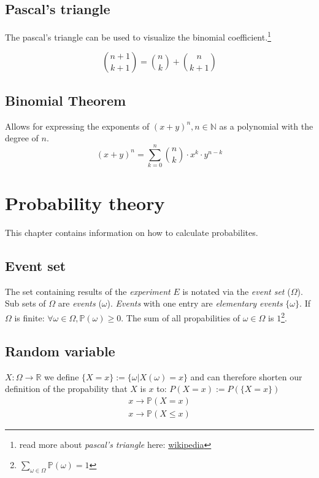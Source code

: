 \documentclass[twoside, a4paper, twocolumn]{article}
\begin{document}
    \subsection{Pascal's triangle}
    The pascal's triangle can be used to visualize the binomial
    coefficient.\footnote{read more about \textit{pascal's triangle}
    here: \href{https://en.wikipedia.org/wiki/Pascal's_triangle}{wikipedia}}

    \begin{equation}
        \binom{n+1}{k+1} = \binom{n}{k} + \binom{n}{k+1}
    \end{equation}

    \subsection{Binomial Theorem}
    Allows for expressing the exponents of $(x+y)^n, n \in \mathbb{N}$ as a
    polynomial with the degree of $n$.
    \begin{equation}
        (x+y)^n = \sum^n_{k=0} \binom{n}{k} \cdot x^k \cdot y^{n-k}
    \end{equation}

    \section{Probability theory}
    This chapter contains information on how to calculate probabilites.

    \subsection{Event set} The set containing results of the
    \textit{experiment} $E$ is notated via the \textit{event set} ($\Omega$).
    Sub sets of $\Omega$ are \textit{events} ($\omega$). \textit{Events} with
    one entry are \textit{elementary events} $\{\omega\}$. If $\Omega$ is
    finite: $\forall \omega \in \Omega,\mathbb{P}(\omega) \geq 0$. The sum of
    all propabilities of $\omega \in \Omega$ is $1$\footnote{$\sum_{\omega \in
    \Omega} \mathbb{P}(\omega) = 1$}.

    \subsection{Random variable}
    $X: \Omega \rightarrow \mathbb{R}$ we define $\{X = x\} := \{\omega |
    X(\omega) = x\}$ and can therefore shorten our definition of the
    propability that $X$ is $x$ to: $P(X = x) := P(\{X = x\})$
    \begin{eqnarray}
        x \rightarrow \mathbb{P}(X = x) \\
        x \rightarrow \mathbb{P}(X \leq x)
    \end{eqnarray}
\end{document}
